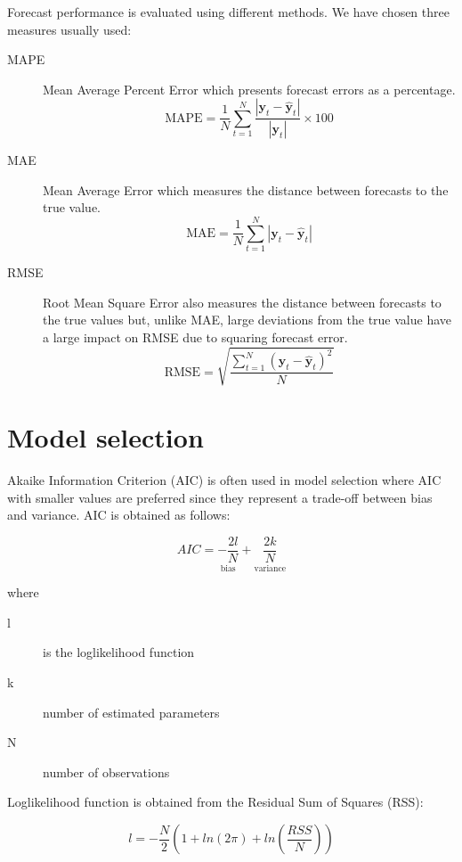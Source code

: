 Forecast performance is evaluated using different methods. We have chosen three
measures usually used:
\begin{description}
\item[MAPE] Mean Average Percent Error which presents forecast errors as a
percentage.
\begin{equation}\label{eq:MAPE}
\text{MAPE} = \frac{1}{N} \sum_{t=1}^{N} 
\frac{\left|\mathbf{y}_t-\hat{\mathbf{y}}_t\right|}{\left|\mathbf{y}_t\right|}
 \times 100 
\end{equation}
\item[MAE] Mean Average Error which measures the distance between forecasts to the
true value.
\begin{equation}\label{eq:MAE}
\text{MAE} = \frac{1}{N} \sum_{t=1}^{N} 
\left| 
\mathbf{y}_t-\hat{\mathbf{y}}_t
\right| 
\end{equation}
\item[RMSE] Root Mean Square Error also measures the distance between forecasts
to the true values but, unlike MAE, large deviations from the true value have a
large impact on RMSE due to squaring forecast error.
\begin{equation}\label{eq:RMSE}
\text{RMSE} = \sqrt{
\frac{\displaystyle \sum_{t=1}^{N} (\mathbf{y}_t-\hat{\mathbf{y}}_t)^2}{N}}
\end{equation}
\end{description}


\section{Model selection} \label{sec:pselection}
Akaike Information Criterion (AIC) is often used in model selection where AIC
with smaller values are preferred since they represent a trade-off between bias
and variance.  AIC is obtained as follows:

\begin{equation}
\label{eq:aicformula}
AIC = \underset{\text{bias}}{-\frac{2l}{N}} + 
\underset{\text{variance}}{\frac{2k}{N}}
\end{equation}

\noindent where 

\begin{description}
\item[l] is the loglikelihood function
\item[k] number of estimated parameters
\item[N] number of observations
\end{description}

Loglikelihood function is obtained from the Residual Sum of Squares (RSS):

\begin{equation}
\label{eq:ll}
l = -\frac{N}{2} \left(1 + ln(2\pi) + ln\left(\frac{RSS}{N}\right)\right) 
\end{equation}
